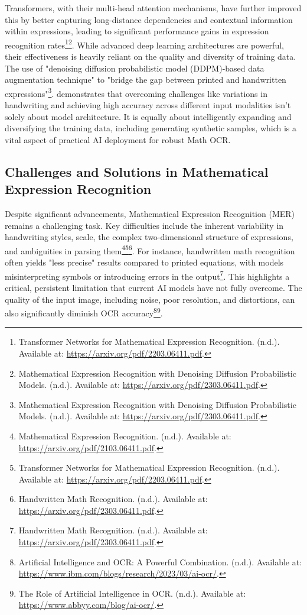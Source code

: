 Transformers, with their multi-head attention mechanisms, have further improved this by better capturing long-distance dependencies and contextual information within expressions, leading to significant performance gains in expression recognition rates\footnote{Transformer Networks for Mathematical Expression Recognition. (n.d.). Available at: \url{https://arxiv.org/pdf/2203.06411.pdf}.}\footnote{Mathematical Expression Recognition with Denoising Diffusion Probabilistic Models. (n.d.). Available at: \url{https://arxiv.org/pdf/2303.06411.pdf}.}. While advanced deep learning architectures are powerful, their effectiveness is heavily reliant on the quality and diversity of training data. The use of "denoising diffusion probabilistic model (DDPM)-based data augmentation technique" to "bridge the gap between printed and handwritten expressions"\footnote{Mathematical Expression Recognition with Denoising Diffusion Probabilistic Models. (n.d.). Available at: \url{https://arxiv.org/pdf/2303.06411.pdf}.}. demonstrates that overcoming challenges like variations in handwriting and achieving high accuracy across different input modalities isn't solely about model architecture. It is equally about intelligently expanding and diversifying the training data, including generating synthetic samples, which is a vital aspect of practical AI deployment for robust Math OCR.

\subsection{Challenges and Solutions in Mathematical Expression Recognition}\label{subsec:challenges-math-recognition}
Despite significant advancements, Mathematical Expression Recognition (MER) remains a challenging task. Key difficulties include the inherent variability in handwriting styles, scale, the complex two-dimensional structure of expressions, and ambiguities in parsing them\footnote{Mathematical Expression Recognition. (n.d.). Available at: \url{https://arxiv.org/pdf/2103.06411.pdf}.}\footnote{Transformer Networks for Mathematical Expression Recognition. (n.d.). Available at: \url{https://arxiv.org/pdf/2203.06411.pdf}.}\footnote{Handwritten Math Recognition. (n.d.). Available at: \url{https://arxiv.org/pdf/2303.06411.pdf}.}. For instance, handwritten math recognition often yields "less precise" results compared to printed equations, with models misinterpreting symbols or introducing errors in the output\footnote{Handwritten Math Recognition. (n.d.). Available at: \url{https://arxiv.org/pdf/2303.06411.pdf}.}. This highlights a critical, persistent limitation that current AI models have not fully overcome. The quality of the input image, including noise, poor resolution, and distortions, can also significantly diminish OCR accuracy\footnote{Artificial Intelligence and OCR: A Powerful Combination. (n.d.). Available at: \url{https://www.ibm.com/blogs/research/2023/03/ai-ocr/}.}\footnote{The Role of Artificial Intelligence in OCR. (n.d.). Available at: \url{https://www.abbyy.com/blog/ai-ocr/}.}.

